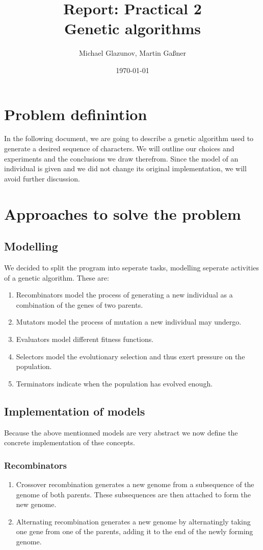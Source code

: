 \documentclass[a4paper,10pt]{article}
\title{Report: Practical 2 \\ Genetic algorithms}
\author{Michael Glazunov, Martin Gaßner}
\date{\today}
\begin{document}
\maketitle

\newpage
{}

\section{Problem definintion}
In the following document, we are going to describe a genetic algorithm used to generate a desired sequence of characters. We will outline our choices and experiments and the conclusions we draw therefrom.\newline
Since the model of an individual is given and we did not change its original implementation, we will avoid further discussion.

\section{Approaches to solve the problem}
\subsection{Modelling}
We decided to split the program into seperate tasks, modelling seperate activities of a genetic algorithm. These are:
\begin{enumerate}
 \item Recombinators model the process of generating a new individual as a combination of the genes of two parents.
 \item Mutators model the process of mutation a new individual may undergo.
 \item Evaluators model different fitness functions.
 \item Selectors model the evolutionary selection and thus exert pressure on the population.
 \item Terminators indicate when the population has evolved enough.
\end{enumerate}
\subsection{Implementation of models}
Because the above mentionned models are very abstract we now define the concrete implementation of thse concepts.

\subsubsection{Recombinators}
\begin{enumerate}
 \item Crossover recombination generates a new genome from a subsequence of the genome of both parents. These subsequences are then attached to form the new genome.
 \item Alternating recombination generates a new genome by alternatingly taking one gene from one of the parents, adding it to the end of the newly forming genome.
\end{enumerate}
\end{document}

